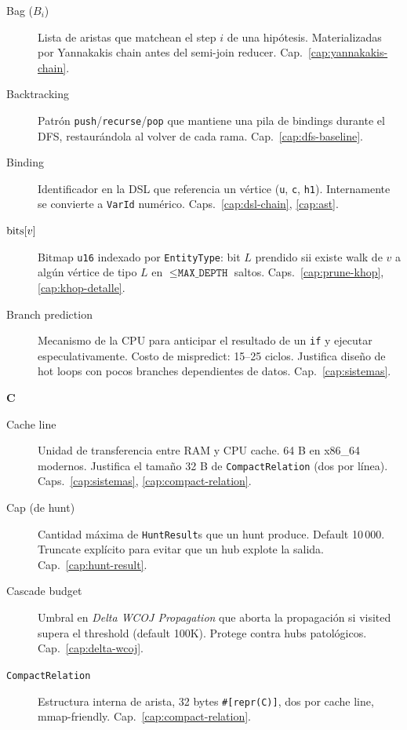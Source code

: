 \begin{description}
    \item[Bag (\(B_i\))] Lista de aristas que matchean el step
    \(i\) de una hipótesis. Materializadas por Yannakakis chain
    antes del semi-join reducer. Cap.~\ref{cap:yannakakis-chain}.

    \item[Backtracking] Patrón \texttt{push}/\texttt{recurse}/\texttt{pop}
    que mantiene una pila de bindings durante el DFS, restaurándola
    al volver de cada rama. Cap.~\ref{cap:dfs-baseline}.

    \item[Binding] Identificador en la DSL que referencia un
    vértice (\texttt{u}, \texttt{c}, \texttt{h1}). Internamente se
    convierte a \texttt{VarId} numérico. Caps.~\ref{cap:dsl-chain},
    \ref{cap:ast}.

    \item[{\(\mathrm{bits}[v]\)}] Bitmap \texttt{u16} indexado por
    \texttt{EntityType}: bit \(L\) prendido sii existe walk de
    \(v\) a algún vértice de tipo \(L\) en
    \(\leq \texttt{MAX\_DEPTH}\) saltos.
    Caps.~\ref{cap:prune-khop}, \ref{cap:khop-detalle}.

    \item[Branch prediction] Mecanismo de la CPU para anticipar el
    resultado de un \texttt{if} y ejecutar especulativamente. Costo
    de mispredict: 15--25 ciclos. Justifica diseño de hot loops
    con pocos branches dependientes de datos. Cap.~\ref{cap:sistemas}.
\end{description}

\noindent
\textbf{C}

\begin{description}
    \item[Cache line] Unidad de transferencia entre RAM y CPU
    cache. 64 B en x86\_64 modernos. Justifica el tamaño 32 B de
    \texttt{CompactRelation} (dos por línea).
    Caps.~\ref{cap:sistemas}, \ref{cap:compact-relation}.

    \item[Cap (de hunt)] Cantidad máxima de \texttt{HuntResult}s
    que un hunt produce. Default 10\,000. Truncate explícito para
    evitar que un hub explote la salida. Cap.~\ref{cap:hunt-result}.

    \item[Cascade budget] Umbral en \emph{Delta WCOJ Propagation}
    que aborta la propagación si visited supera el threshold
    (default 100K). Protege contra hubs patológicos.
    Cap.~\ref{cap:delta-wcoj}.

    \item[\texttt{CompactRelation}] Estructura interna de arista,
    32 bytes \texttt{\#[repr(C)]}, dos por cache line, mmap-friendly.
    Cap.~\ref{cap:compact-relation}.
\end{description}

